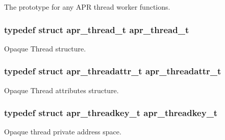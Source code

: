 The prototype for any A\-P\-R thread worker functions. \hypertarget{group__apr__thread__proc_ga646c71351e723d84f8cc8c8d1d5937be}{
\subsubsection[{apr\-\_\-thread\-\_\-t}]{\setlength{\rightskip}{0pt plus 5cm}typedef struct {\bf apr\-\_\-thread\-\_\-t} {\bf apr\-\_\-thread\-\_\-t}}}\label{group__apr__thread__proc_ga646c71351e723d84f8cc8c8d1d5937be}
Opaque Thread structure. \hypertarget{group__apr__thread__proc_ga35de571e9944871c10b38d8feef885ac}{
\subsubsection[{apr\-\_\-threadattr\-\_\-t}]{\setlength{\rightskip}{0pt plus 5cm}typedef struct {\bf apr\-\_\-threadattr\-\_\-t} {\bf apr\-\_\-threadattr\-\_\-t}}}\label{group__apr__thread__proc_ga35de571e9944871c10b38d8feef885ac}
Opaque Thread attributes structure. \hypertarget{group__apr__thread__proc_ga337c9c1bd2d47740022071a5c41f2edb}{
\subsubsection[{apr\-\_\-threadkey\-\_\-t}]{\setlength{\rightskip}{0pt plus 5cm}typedef struct {\bf apr\-\_\-threadkey\-\_\-t} {\bf apr\-\_\-threadkey\-\_\-t}}}\label{group__apr__thread__proc_ga337c9c1bd2d47740022071a5c41f2edb}
Opaque thread private address space. 

